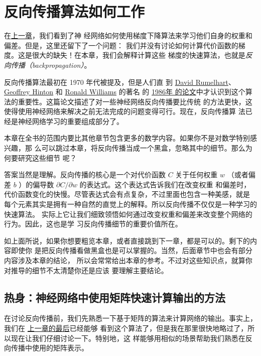 
\chapter{反向传播算法如何工作}
\label{ch:HowTheBackpropagationAlgorithmWorks}

在\hyperref[ch:UsingNeuralNetsToRecognizeHandwrittenDigits]{上一章}，我们看到了神
经网络如何使用梯度下降算法来学习他们自身的权重和偏差。但是，这里还留下了一个问题：
我们并没有讨论如何计算代价函数的梯度。这是很大的缺失！在本章，我们会解释计算这些
梯度的快速算法，也就是\emph{反向传播（backpropagation）}。

反向传播算法最初在 1970 年代被提及，但是人们直
到 \href{http://en.wikipedia.org/wiki/David_Rumelhart}{David
  Rumelhart}、 \href{http://www.cs.toronto.edu/~hinton/}{Geoffrey
  Hinton} 和 \href{http://en.wikipedia.org/wiki/Ronald_J._Williams}{Ronald
  Williams} 的著名
的 \href{http://www.nature.com/nature/journal/v323/n6088/pdf/323533a0.pdf}{1986年
  的论文}中才认识到这个算法的重要性。这篇论文描述了对一些神经网络反向传播要比传统
的方法更快，这使得使用神经网络来解决之前无法完成的问题变得可行。现在，反向传播算
法已经是神经网络学习的重要组成部分了。

本章在全书的范围内要比其他章节包含更多的数学内容。如果你不是对数学特别感兴趣，那
么可以跳过本章，将反向传播当成一个黑盒，忽略其中的细节。那么为何要研究这些细节
呢？

答案当然是理解。反向传播的核心是一个对代价函数 $C$ 关于任何权重 $w$ （或者偏
差 $b$ ）的偏导数 $\partial C/\partial w$ 的表达式。这个表达式告诉我们在改变权重
和偏差时，代价函数变化的快慢。尽管表达式会有点复杂，不过里面也包含一种美感，就是
每个元素其实是拥有一种自然的直觉上的解释。所以反向传播不仅仅是一种学习的快速算法。
实际上它让我们细致领悟如何通过改变权重和偏差来改变整个网络的行为。因此，这也是学
习反向传播细节的重要价值所在。

如上面所说，如果你想要粗览本章，或者直接跳到下一章，都是可以的。剩下的内容即使你
是把反向传播看做黑盒也是可以掌握的。当然，后面章节中也会有部分内容涉及本章的结论，
所以会常常给出本章的参考。不过对这些知识点，就算你对推导的细节不太清楚你还是应该
要理解主要结论。

\section{热身：神经网络中使用矩阵快速计算输出的方法}
\label{sec:warm_up}

在讨论反向传播前，我们先熟悉一下基于矩阵的算法来计算网络的输出。事实上，我们在%
\hyperref[sec:implementing_our_network_to_classify_digits]{上一章的最后}已经能够
看到这个算法了，但是我在那里很快地略过了，所以现在让我们仔细讨论一下。特别地，这
样能够用相似的场景帮助我们熟悉在反向传播中使用的矩阵表示。

